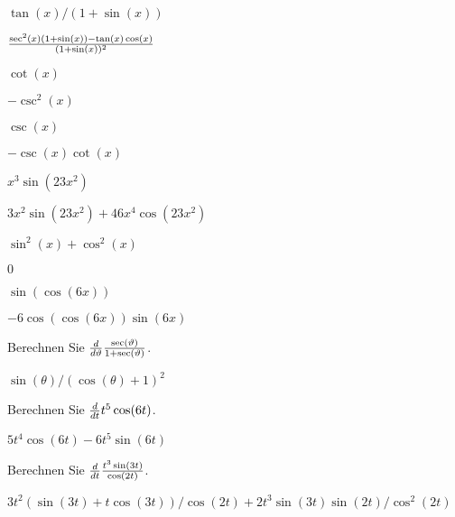 \begin{exercises}
\begin{exercise} $\tan(x)/(1+\sin(x))$
\begin{answer} ${\sec^2(x)(1+\sin(x))-\tan(x) \cos(x)\over (1+\sin(x))^2}$
\end{answer}\end{exercise}

\begin{exercise} $\cot(x)$
\begin{answer} $ -\csc^2(x)$
\end{answer}\end{exercise}

\begin{exercise} $\csc(x)$
\begin{answer} $ -\csc(x)\cot(x)$
\end{answer}\end{exercise}

\begin{exercise} $x^3 \sin (23x^2 )$
\begin{answer} $3x^2\sin(23x^2)+46x^4\cos(23x^2)$
\end{answer}\end{exercise}

\begin{exercise} $\sin ^2(x) + \cos ^2(x)$
 \begin{answer} $0$
\end{answer}\end{exercise}

\begin{exercise}  $\sin (\cos (6x) )$
 \begin{answer} $-6\cos(\cos(6x))\sin(6x)$
\end{answer}\end{exercise}

\endtwocol

\begin{exercise} Berechnen Sie ${d\over d\theta}{\sec(\theta)\over 1+\sec(\theta)}$.
 \begin{answer} $\sin(\theta)/(\cos(\theta)+1)^2$
\end{answer}\end{exercise}

\begin{exercise} Berechnen Sie ${d\over dt}t^5 \cos (6t)$.
\begin{answer} $5t^4\cos(6t)-6t^5\sin(6t)$
\end{answer}\end{exercise}

\begin{exercise} Berechnen Sie ${d\over dt}{t^3 \sin (3t)\over\cos (2t)}$.
\begin{answer} $3t^2(\sin(3t)+t\cos(3t))/\cos(2t)+2t^3\sin(3t)\sin(2t)/\cos^2(2t)$
\end{answer}\end{exercise}


\end{exercises}

